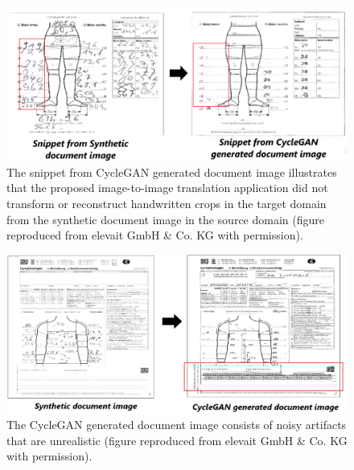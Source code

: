 \begin{figure}[H]
        \begin{center}
	    \includegraphics[scale=0.28]{images/Evaluation/failure1.png}
	    \caption[The snippet from \ac{CycleGAN} generated document image illustrates that the proposed image-to-image translation application did not transform or reconstruct handwritten crops in the target domain from the synthetic document image in the source domain.]{The snippet from \ac{CycleGAN} generated document image illustrates that the proposed image-to-image translation application did not transform or reconstruct handwritten crops in the target domain from the synthetic document image in the source domain (figure reproduced from elevait GmbH \& Co. KG with permission).}
	    \label{fig:failure1}
	    \end{center}
\end{figure}

\begin{figure}[H]
        \begin{center}
	    \includegraphics[scale=0.50]{images/Evaluation/failure2.png}
	    \caption[The \ac{CycleGAN} generated document image consists of noisy artifacts that are unrealistic.]{The \ac{CycleGAN} generated document image consists of noisy artifacts that are unrealistic (figure reproduced from elevait GmbH \& Co. KG with permission).}
	    \label{fig:failure2}
	    \end{center}
\end{figure}

